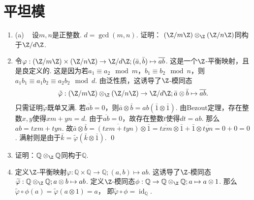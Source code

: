 \setcounter{section}{4}
\section{平坦模}
   \begin{enumerate}

    \item[5.1] (a)\ \ \,设$m,n$是正整数. $d=\gcd(m,n)$. 证明：
        $(\Z/m\Z) \otimes_{\Z} (\Z/n\Z)$同构于$\Z/d\Z$.
    \item[\textbf{证明:}]
        令$\varphi: (\Z/m\Z) \times (\Z/n\Z) \rightarrow \Z/d\Z ; 
        (\bar{a},\bar{b}) \mapsto \overline{ab}$. 这是一个$\Z$-平衡映射，且是良定义的. 
        这是因为若$a_{1}\equiv a_{2}\!\!\mod m$，$b_{1}\equiv b_{2}\!\!\mod n$，则
        $a_{1}b_{1} \equiv a_{1}b_{2} \equiv a_{2}b_{2}\!\!\mod d$. 
        由泛性质，这诱导了$\Z$-模同态
        \[
         \tilde{\varphi}:(\Z/m\Z) \otimes_{\Z} (\Z/n\Z) 
         \rightarrow \Z/d\Z ; \bar{a} \otimes \bar{b} \mapsto \overline{ab}.
        \]
        只需证明$\widetilde{\varphi}$既单又满. 
        若$\overline{ab}=0$，则$\bar{a} \otimes \bar{b} 
        = ab(\bar{1} \otimes \bar{1})$. 
        由Bezout定理，存在整数$x,y$使得$xm+yn=d$. 
        由于$\overline{ab}=0$，故存在整数$t$使得$dt=ab$.
        那么$ab=txm+tyn$. 故$\bar{a} \otimes \bar{b} 
        = \overline{(txm+tyn)} \otimes \bar{1} 
        = \overline{txm} \otimes \bar{1} + \bar{1} \otimes \overline{tyn} 
        = 0+0 =0$.
        满射则是由于$\bar{k}=\widetilde{\varphi}(\bar{k} \otimes \bar{1})$. \qed
    \item[(b)] 证明：$\mathbb{Q} \otimes_{\Z} \mathbb{Q}$同构于$\mathbb{Q}$.
    \item[\textbf{证明:}]
        定义$\Z$-平衡映射$\varphi: \mathbb{Q} \times \mathbb{Q} 
        \rightarrow \mathbb{Q}; (a,b) \mapsto ab$. 
        这诱导了$\Z$-模同态$\widetilde{\varphi}:
        \mathbb{Q} \otimes_{\Z} \mathbb{Q}; a \otimes b \mapsto ab$.
        定义$\Z$-模同态$\phi:\mathbb{Q} \rightarrow 
        \mathbb{Q} \otimes_{\Z} \mathbb{Q};a \mapsto a \otimes 1$. 
        那么$\widetilde{\varphi}\circ\phi(a)
        = \widetilde{\varphi}(a \otimes 1) = a$，
        即$\widetilde{\varphi}\circ\phi = \operatorname{id}_{\mathbb{Q}}$. 

\end{enumerate}
